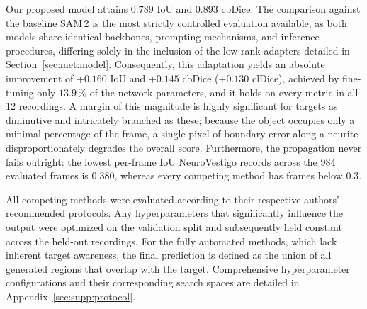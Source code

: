 \documentclass[11pt,a4paper]{article}
\makeatletter
\let\SD@subsection\subsection
\renewcommand\subsection{\FloatBarrier\@ifstar{\SD@subsection*}{\SD@subsection}}
\makeatother
\begin{document}
Our proposed model attains $0.789$ IoU and $0.893$ cbDice. The comparison
against the baseline SAM\,2 is the most strictly controlled evaluation
available, as both models share identical backbones, prompting mechanisms,
and inference procedures, differing solely in the inclusion of the low-rank
adapters detailed in Section~\ref{sec:met:model}. Consequently, this
adaptation yields an absolute improvement of $+0.160$ IoU and $+0.145$
cbDice ($+0.130$ clDice), achieved by fine-tuning only $13.9\,\%$ of the
network parameters, and it holds on every metric in all 12 recordings. A
margin of this magnitude is highly significant for targets as diminutive and
intricately branched as these; because the object occupies only a minimal
percentage of the frame, a single pixel of boundary error along a neurite
disproportionately degrades the overall score. Furthermore, the
propagation never fails outright: the lowest per-frame IoU NeuroVestigo records
across the 984 evaluated frames is $0.380$, whereas every competing method has
frames below $0.3$.

All competing methods were evaluated according to their respective authors'
recommended protocols. Any hyperparameters that significantly influence the
output were optimized on the validation split and subsequently held constant
across the held-out recordings. For the fully automated methods, which lack
inherent target awareness, the final prediction is defined as the union of
all generated regions that overlap with the target. Comprehensive
hyperparameter configurations and their corresponding search spaces are
detailed in Appendix~\ref{sec:supp:protocol}.







\subsection{Temporal consistency}
\label{sec:res:temporal}
\end{document}
